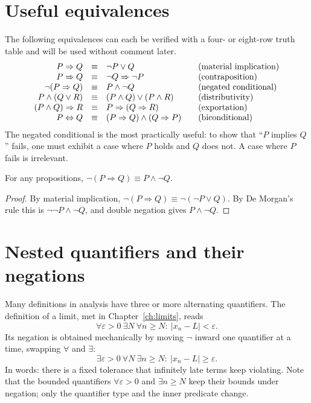 \section{Useful equivalences}
The following equivalences can each be verified with a four- or eight-row truth table and will be used without comment later.
\[
\begin{array}{rcl@{\qquad}l}
P\Rightarrow Q&\equiv&\neg P\lor Q & \text{(material implication)}\\
P\Rightarrow Q&\equiv&\neg Q\Rightarrow\neg P & \text{(contraposition)}\\
\neg(P\Rightarrow Q)&\equiv&P\land\neg Q & \text{(negated conditional)}\\
P\land(Q\lor R)&\equiv&(P\land Q)\lor(P\land R) & \text{(distributivity)}\\
(P\land Q)\Rightarrow R&\equiv&P\Rightarrow(Q\Rightarrow R) & \text{(exportation)}\\
P\Leftrightarrow Q&\equiv&(P\Rightarrow Q)\land(Q\Rightarrow P) & \text{(biconditional)}
\end{array}
\]
The negated conditional is the most practically useful: to show that ``$P$ implies $Q$'' fails, one must exhibit a case where $P$ holds and $Q$ does not. A case where $P$ fails is irrelevant.

\begin{proposition}
For any propositions, $\neg(P\Rightarrow Q)\equiv P\land\neg Q$.
\end{proposition}
\begin{proof}
By material implication, $\neg(P\Rightarrow Q)\equiv\neg(\neg P\lor Q)$. By De Morgan's rule this is $\neg\neg P\land\neg Q$, and double negation gives $P\land\neg Q$.
\end{proof}

\section{Nested quantifiers and their negations}
Many definitions in analysis have three or more alternating quantifiers. The definition of a limit, met in Chapter~\ref{ch:limits}, reads
\[
\forall\varepsilon>0\ \exists N\ \forall n\ge N:\ |x_n-L|<\varepsilon.
\]
Its negation is obtained mechanically by moving $\neg$ inward one quantifier at a time, swapping $\forall$ and $\exists$:
\[
\exists\varepsilon>0\ \forall N\ \exists n\ge N:\ |x_n-L|\ge\varepsilon.
\]
In words: there is a fixed tolerance that infinitely late terms keep violating. Note that the bounded quantifiers $\forall\varepsilon>0$ and $\exists n\ge N$ keep their bounds under negation; only the quantifier type and the inner predicate change.

